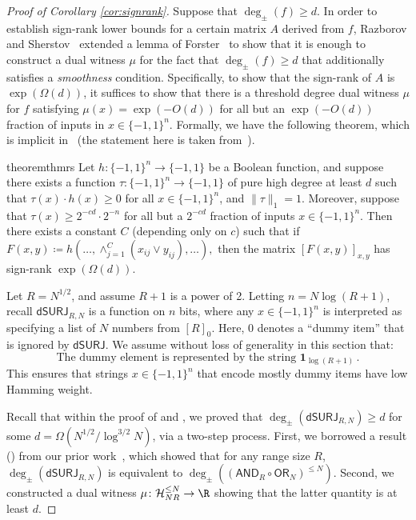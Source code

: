 \documentclass{toc}
\newcommand{\dumSURJ}{\mathsf{dSURJ}}
\newcommand{\OR}{\mathsf{ OR}}
\newcommand{\bits}{\{-1,1\}}
\newcommand{\AND}{\mathsf{AND}}
\begin{document}
%
\begin{proof}[Proof of Corollary \ref{cor:signrank}]
Suppose that $\deg_{\pm}(f) \geq d$. 
In order to establish sign-rank lower bounds for a certain matrix $A$ derived from $f$, Razborov and Sherstov~\cite{razborovsherstov} extended a lemma of Forster~\cite{forster} to show that it is enough to 
construct a dual witness $\mu$ for the fact that $\deg_{\pm}(f) \geq d$ that additionally satisfies a \emph{smoothness} condition. Specifically,
to show that the sign-rank of $A$ is $\exp(\Omega(d))$, it suffices to show that there is a threshold
degree dual witness $\mu$ for $f$ satisfying $\mu(x) = \exp(-O(d))$ for
all but an $\exp\left(-O(d)\right)$ fraction of inputs in $x \in \{-1, 1\}^n$. Formally, we have the following
theorem, which is implicit in~\cite{razborovsherstov} (the statement here is taken from~\cite[Theorem 4.1]{bt16}). 


\begin{restatable}{theorem}{thmrs} \label{thm:rs}
	Let $h \colon \bits^n \to \bits$ be a Boolean function, and suppose there exists a function $\tau \colon \bits^n \to \bits$ of pure high degree
	at least $d$
	such that $\tau(x) \cdot h(x) \geq 0$ for all $x \in \bits^n$, and $\|\tau\|_1=1$. 
	Moreover, suppose that $\tau(x) \ge 2^{-cd} \cdot 2^{-n}$ for all but a $2^{-cd}$ fraction of inputs $x \in \bits^n$. Then there exists a constant $C$ (depending only on $c$) such that if $F(x, y) \coloneqq  h(\dots, \land_{j = 1}^C (x_{ij} \lor y_{ij}), \dots),$
	then the matrix $[F(x, y)]_{x, y}$ has sign-rank $\exp(\Omega(d))$.
\end{restatable}

Let $R=N^{1/2}$, and assume $R+1$ is a power of 2. Letting $n=N \log(R+1)$, 
recall $\dumSURJ_{R, N}$ is a function on $n$ bits, where any $x \in \bits^n$
is interpreted as specifying a list of $N$ numbers from $[R]_0$. Here, 0 denotes
a ``dummy item'' that is ignored by $\dumSURJ$. 
We assume without loss of generality in this section that:
\begin{equation} 
\label{dummyencoding}
\text{The dummy element is represented by the string } \mathbf{1}_{\log(R+1)}\,.
\end{equation}
This ensures that strings $x \in \bits^n$ that encode mostly dummy items have low Hamming weight.

Recall that within the proof of  and , we proved that $\deg_{\pm}(\dumSURJ_{R, N}) \geq d$ for some $d=\Omega(N^{1/2}/\log^{3/2} N)$, via a two-step process. 
First, we borrowed a result ()
from our prior work~\cite{adegsurj}, which showed that for any range size $R$, $\deg_{\pm}(\dumSURJ_{R, N})$ is equivalent to $\deg_{\pm}\left(\left(\AND_R \circ \OR_N\right)^{\leq N}\right)$. Second, we constructed a dual witness $\mu \colon \mathcal{H}_{NR}^{\leq N} \to \R$ showing that the latter quantity is at least $d$. %


\end{proof}
\end{document}
